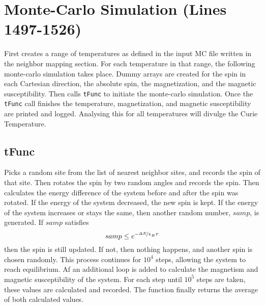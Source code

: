 \documentclass[12pt]{article}
\newcommand{\pmint}[1]{\texttt{#1}}
\begin{document}
\section*{Monte-Carlo Simulation (Lines 1497-1526)} %
First creates a range of temperatures as defined in the input MC file written in the neighbor mapping section. For each temperature in that range, the following monte-carlo simulation takes place. Dummy arrays are created for the spin in each Cartesian direction, the absolute spin, the magnetization, and the magnetic susceptibility. Then calls \pmint{tFunc} to initiate the monte-carlo simulation. Once the \pmint{tFunc} call finishes the temperature, magnetization, and magnetic susceptibility are printed and logged. Analysing this for all temperatures will divulge the Curie Temperature. 
\subsection*{tFunc}\label{sec:tFunc}
Picks a random site from the list of nearest neighbor sites, and records the spin of that site. Then rotates the spin by two random angles and records the spin. Then calculates the energy difference of the system before and after the spin was rotated. If the energy of the system decreased, the new spin is kept. If the energy of the system increases or stays the same, then another random number, $samp$, is generated. If $samp$ satisfies
\begin{equation*}
    samp \leq e^{-\nicefrac{\Delta E}{k_B T}}
\end{equation*}
then the spin is still updated. If not, then nothing happens, and another spin is chosen randomly. This process continues for $10^4$ steps, allowing the system to reach equilibrium. Af an additional loop is added to calculate the magnetism and magnetic susceptibility of the system. For each step until $10^5$ steps are taken, these values are calculated and recorded. The function finally returns the average of both calculated values. 

\end{document}
